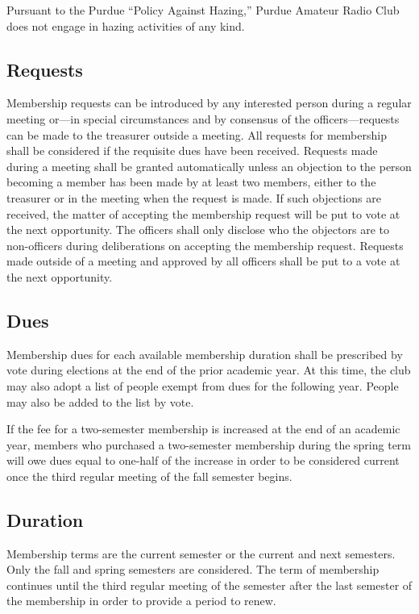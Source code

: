 \documentclass{article}
\begin{document}
Pursuant to the Purdue ``Policy Against Hazing,'' Purdue Amateur Radio Club does
not engage in hazing activities of any kind.

\subsection{Requests}

Membership requests can be introduced by any interested person during a regular
meeting or---in special circumstances and by consensus of the
officers---requests can be made to the treasurer outside a meeting. All requests
for membership shall be considered if the requisite dues have been received.
Requests made during a meeting shall be granted automatically unless an
objection to the person becoming a member has been made by at least two members,
either to the treasurer or in the meeting when the request is made. If such
objections are received, the matter of accepting the membership request will be
put to vote at the next opportunity. The officers shall only disclose who the
objectors are to non-officers during deliberations on accepting the membership
request. Requests made outside of a meeting and approved by all officers shall
be put to a vote at the next opportunity.

\subsection{Dues}

Membership dues for each available membership duration shall be prescribed by
vote during elections at the end of the prior academic year. At this time, the
club may also adopt a list of people exempt from dues for the following year.
People may also be added to the list by vote.

If the fee for a two-semester membership is increased at the end of an academic
year, members who purchased a two-semester membership during the spring term
will owe dues equal to one-half of the increase in order to be considered
current once the third regular meeting of the fall semester begins.

\subsection{Duration}

Membership terms are the current semester or the current and next semesters.
Only the fall and spring semesters are considered. The term of membership
continues until the third regular meeting of the semester after the last
semester of the membership in order to provide a period to renew.
\end{document}
